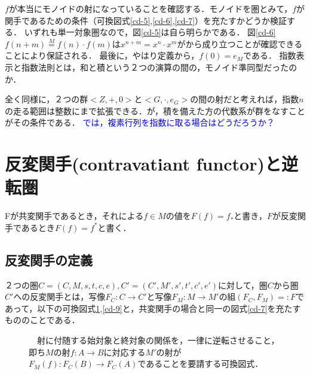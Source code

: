 \documentclass[uplatex, 12pt, dvipdfmx]{jsreport}
\begin{document}
$f$が本当にモノイドの射になっていることを確認する．モノイドを圏とみて，$f$が関手であるための条件（可換図式\ref{cd-5},\ref{cd-6},\ref{cd-7}）を充たすかどうか検証する．
いずれも単一対象圏なので，図\ref{cd-5}は自ら明らかである．
図\ref{cd-6}$f(n+m)\overset{M}{=}f(n)\cdot f(m)$は$x^{n+m}=x^n\cdot x^m$がから成り立つことが確認できることにより保証される．
最後に，やはり定義から，$f(0)=e_M$である．
指数表示と指数法則とは，和と積という２つの演算の間の，モノイド準同型だったのか．

全く同様に，２つの群$<Z,+,0>$と$<G,\cdot, e_G>$の間の射だと考えれば，指数$n$の走る範囲は整数にまで拡張できる．が，積を備えた方の代数系が群をなすことがその条件である．
\textcolor{blue}{では，複素行列を指数に取る場合はどうだろうか？}


\section{反変関手(contravatiant functor)と逆転圏}
Fが共変関手であるとき，それによる$f\in M$の値を$F(f)=f_*$と書き，$F$が反変関手であるとき$F(f)=f^*$と書く．

\subsection{反変関手の定義}

\begin{shadebox}\begin{definition}[（反変）関手]
    ２つの圏$C=(C,M,s,t,c,e),C'=(C',M',s',t',c',e')$に対して，圏$C$から圏$C'$への反変関手とは，写像$F_C:C\rightarrow C'$と写像$F_M:M\rightarrow M'$の組$(F_C,F_M)=:F$であって，以下の可換図式\ref{cd-8},\ref{cd-9}と，共変関手の場合と同一の図式\ref{cd-7}を充たすもののことである．
\end{definition}\end{shadebox}

\begin{figure}[ht]\begin{center} \caption{\label{cd-8}　射に付随する始対象と終対象の関係を，一律に逆転させること，即ち$M$の射$f:A\to B$に対応する$M'$の射が$F_M(f):F_C(B)\to F_C(A)$であることを要請する可換図式．}
\end{center}\end{figure}
\end{document}
